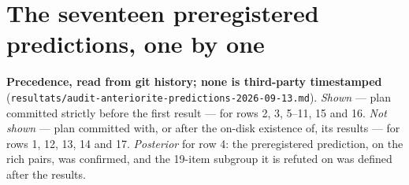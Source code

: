 \documentclass[sigconf,anonymous,review]{acmart}
\begin{document}
\section{The seventeen preregistered predictions, one by one}

\textbf{Precedence, read from git history; none is third-party timestamped} (\texttt{resultats/\allowbreak{}audit-\allowbreak{}anteriorite-\allowbreak{}predictions-\allowbreak{}2026-\allowbreak{}09-\allowbreak{}13\allowbreak{}.md}). \textit{Shown} --- plan committed strictly before the first result --- for rows 2, 3, 5--11, 15 and 16. \textit{Not shown} --- plan committed with, or after the on-disk existence of, its results --- for rows 1, 12, 13, 14 and 17. \textit{Posterior} for row 4: the preregistered prediction, on the rich pairs, was confirmed, and the 19-item subgroup it is refuted on was defined after the results.
\end{document}
